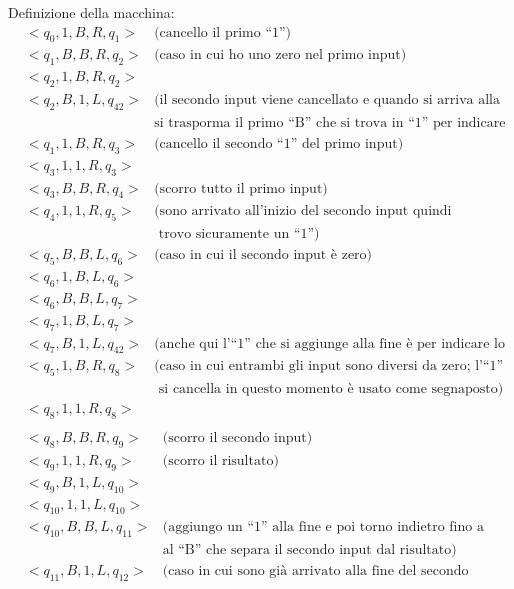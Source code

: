 \begin{esempio}[Prodotto]
Definizione della macchina:\\
\begin{eqnarray*}
&<q_{0},1,B,R,q_{1}>&\mbox{(cancello il primo ``1'')}\\
&<q_{1},B,B,R,q_{2}>&\mbox{(caso in cui ho uno zero nel primo input)}\\
&<q_{2},1,B,R,q_{2}>&\\
&<q_{2},B,1,L,q_{42}>&\mbox{(il secondo input viene cancellato e quando si arriva alla fine }\\
&&\mbox{si trasporma il primo ``B'' che si trova in ``1'' per indicare lo ``0'')}\\
&<q_{1},1,B,R,q_{3}>&\mbox{(cancello il secondo ``1'' del primo input)}\\
&<q_{3},1,1,R,q_{3}>&\\
&<q_{3},B,B,R,q_{4}>&\mbox{(scorro tutto il primo input)}\\
&<q_{4},1,1,R,q_{5}>&\mbox{(sono arrivato all'inizio del secondo input quindi}\\
&&\mbox{ trovo sicuramente un ``1'')}\\
&<q_{5},B,B,L,q_{6}>&\mbox{(caso in cui il secondo input \`e zero)}\\
&<q_{6},1,B,L,q_{6}>&\\
&<q_{6},B,B,L,q_{7}>&\\
&<q_{7},1,B,L,q_{7}>&\\
&<q_{7},B,1,L,q_{42}>&\mbox{(anche qui l'``1'' che si aggiunge alla fine \`e per indicare lo zero)}\\
&<q_{5},1,B,R,q_{8}>&\mbox{(caso in cui entrambi gli input sono diversi da zero; l'``1'' che}\\
&&\mbox{ si cancella in questo momento \`e usato come segnaposto)}\\
&<q_{8},1,1,R,q_{8}>&\\
\end{eqnarray*}
\begin{eqnarray*}
&<q_{8},B,B,R,q_{9}>&\mbox{(scorro il secondo input)}\\
&<q_{9},1,1,R,q_{9}>&\mbox{(scorro il risultato)}\\
&<q_{9},B,1,L,q_{10}>&\\
&<q_{10},1,1,L,q_{10}>&\\
&<q_{10},B,B,L,q_{11}>&\mbox{(aggiungo un ``1'' alla fine e poi torno indietro fino a quando arrivo }\\
&&\mbox{al ``B'' che separa il secondo input dal risultato)}\\
&<q_{11},B,1,L,q_{12}>&\mbox{(caso in cui sono gi\`a arrivato alla fine del secondo input)}\\

\end{eqnarray*}
\end{esempio}
